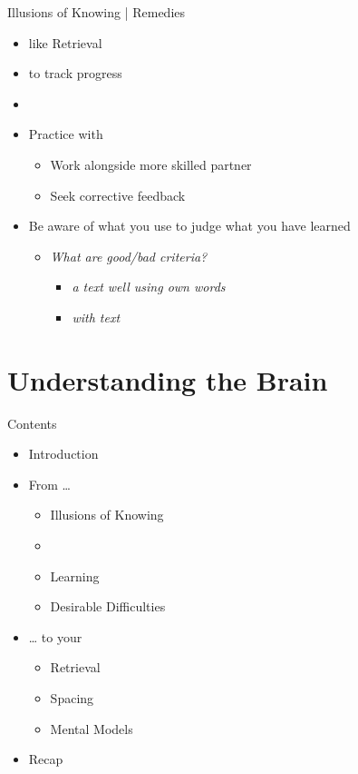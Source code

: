 \documentclass{ercisbeamer}
\begin{document}
\begin{frame}{Illusions of Knowing | Remedies}
    \begin{itemize}
        \item {} like Retrieval
        \item {} to track progress
        \item {}
        \item Practice with 
        \begin{itemize}
            \item Work alongside more skilled partner
            \item Seek corrective feedback
        \end{itemize}
        \item Be aware of what  you use to judge what you have learned
        \begin{itemize}
            \item \emph{What are good/bad criteria?} \pause
            \begin{itemize}
                \item \emph{ a text well using own words}
                \item \emph{ with text}
            \end{itemize}
        \end{itemize}
    \end{itemize}
\end{frame}

\section{Understanding the Brain}
\begin{frame}{Contents}
    \begin{itemize}
        \item Introduction
        \item From …
        \begin{itemize}
            \item Illusions of Knowing
            \item {}
            \item Learning
            \item Desirable Difficulties
        \end{itemize}
        \item … to your 
        \begin{itemize}
            \item Retrieval
            \item Spacing
            \item Mental Models
        \end{itemize}
        \item Recap
    \end{itemize}
\end{frame}
\end{document}
